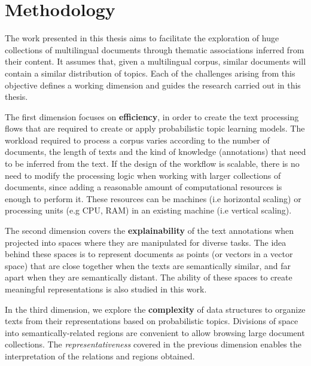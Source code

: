 

\chapter{Methodology}
\label{ch:hypothesis}

\graphicspath{{hypothesis/figures/}}


The work presented in this thesis aims to facilitate the exploration of huge collections of multilingual documents through thematic associations inferred from their content. It assumes that, given a multilingual corpus, similar documents will contain a similar distribution of topics. Each of the challenges arising from this objective defines a working dimension and guides the research carried out in this thesis.

The first dimension focuses on \textbf{efficiency}, in order to create the text processing flows that are required to create or apply probabilistic topic learning models. The workload required to process a corpus varies according to the number of documents, the length of texts and the kind of knowledge (annotations) that need to be inferred from the text. If the design of the workflow is scalable, there is no need to modify the processing logic when working with larger collections of documents, since adding a reasonable amount of computational resources is enough to perform it. These resources can be machines (i.e horizontal scaling) or processing units (e.g CPU, RAM) in an existing machine (i.e vertical scaling). 

The second dimension covers the \textbf{explainability} of the text annotations when projected into spaces where they are manipulated for diverse tasks. The idea behind these spaces is to represent documents as points (or vectors in a vector space) that are close together when the texts are semantically similar, and far apart when they are semantically distant. The ability of these spaces to create meaningful representations is also studied in this work.

In the third dimension, we explore the \textbf{complexity} of data structures to organize texts from their representations based on probabilistic topics. Divisions of space into semantically-related regions are convenient to allow browsing large document collections. The \textit{representativeness} covered in the previous dimension enables the interpretation of the relations and regions obtained.

